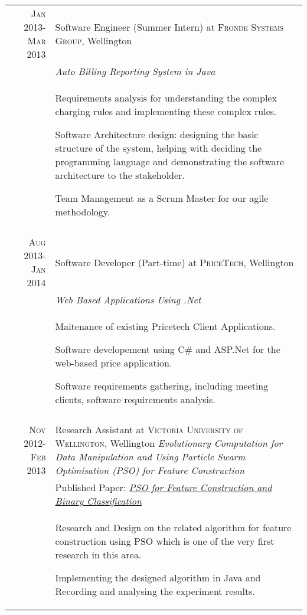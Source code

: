 \documentclass[a4paper,10pt]{article} %
\begin{document}
\begin{tabular}{r|p{11cm}}


\textsc{Jan 2013-Mar 2013} & Software Engineer (Summer Intern) at \textsc{Fronde Systems Group}, Wellington \\
& \emph{Auto Billing Reporting System in Java}\\ 
& \footnotesize{
Requirements analysis for understanding the complex charging rules and implementing these complex rules.

Software Architecture design: designing the basic structure of the system, helping with deciding the programming language and demonstrating the software architecture to the stakeholder.

Team Management as a Scrum Master for our agile methodology.
}\\
\multicolumn{2}{c}{} \\


\textsc{Aug 2013-Jan 2014} & Software Developer (Part-time) at \textsc{PriceTech}, Wellington \\
& \emph{Web Based Applications Using .Net}\\ 
& \footnotesize{
Maitenance of existing Pricetech Client Applications.

Software developement using C\# and ASP.Net for the web-based price application.

Software requirements gathering, including meeting clients, software requirements analysis.
}\\
\multicolumn{2}{c}{} \\


\textsc{Nov 2012-Feb 2013} & Research Assistant at \textsc{Victoria University of Wellington}, Wellington \emph{Evolutionary Computation for Data Manipulation and Using Particle Swarm Optimisation (PSO) for Feature Construction}\\
& Published Paper: \emph{\href{http://dl.acm.org/citation.cfm?id=2463376}{PSO for Feature Construction and Binary Classification}}\\
& \footnotesize{
Research and Design on the related algorithm for feature construction using PSO which is one of the very first research in this area. 

Implementing the designed algorithm in Java and Recording and analysing the experiment results.
}
\end{tabular}
\end{document}
